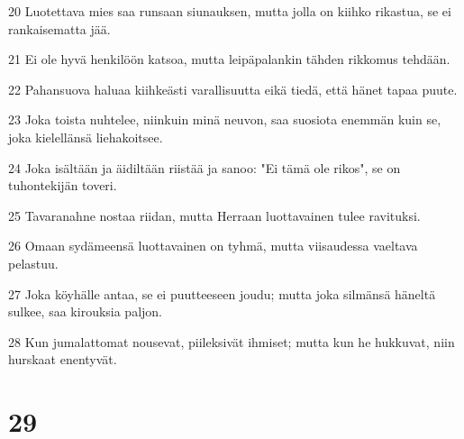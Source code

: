 \par 20 Luotettava mies saa runsaan siunauksen, mutta jolla on kiihko rikastua, se ei rankaisematta jää.
\par 21 Ei ole hyvä henkilöön katsoa, mutta leipäpalankin tähden rikkomus tehdään.
\par 22 Pahansuova haluaa kiihkeästi varallisuutta eikä tiedä, että hänet tapaa puute.
\par 23 Joka toista nuhtelee, niinkuin minä neuvon, saa suosiota enemmän kuin se, joka kielellänsä liehakoitsee.
\par 24 Joka isältään ja äidiltään riistää ja sanoo: "Ei tämä ole rikos", se on tuhontekijän toveri.
\par 25 Tavaranahne nostaa riidan, mutta Herraan luottavainen tulee ravituksi.
\par 26 Omaan sydämeensä luottavainen on tyhmä, mutta viisaudessa vaeltava pelastuu.
\par 27 Joka köyhälle antaa, se ei puutteeseen joudu; mutta joka silmänsä häneltä sulkee, saa kirouksia paljon.
\par 28 Kun jumalattomat nousevat, piileksivät ihmiset; mutta kun he hukkuvat, niin hurskaat enentyvät.

\chapter{29}


